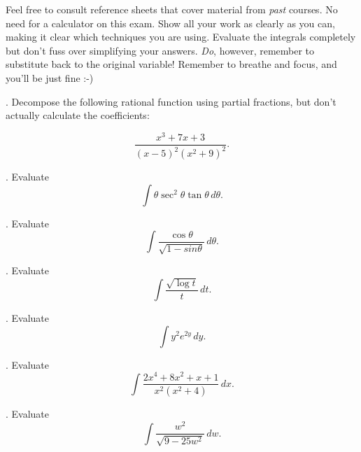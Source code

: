 \documentclass[12pt, letterpaper]{article}
\begin{document}
\noindent Feel free to consult reference sheets that cover material from \emph{past} courses. No need for a calculator on this exam. Show all your work as clearly as you can, making it clear which techniques you are using. Evaluate the integrals completely but don't fuss over simplifying your answers. \emph{Do}, however, remember to substitute back to the original variable! Remember to breathe and focus, and you'll be just fine :-)

\vspace*{0.3in}
. Decompose the following rational function using partial fractions, but don't actually calculate the coefficients:

$$\frac{x^3 + 7x + 3}{(x-5)^2(x^2 + 9)^2}.$$


\vspace*{0.3in}
. Evaluate $$ \int \theta \sec^2{\theta} \tan{\theta} \, d\theta. $$



\vspace*{0.3in}
. Evaluate $$ \int \frac{\cos{\theta}}{\sqrt{1 - sin{\theta}}} \, d\theta. $$



\vspace*{0.3in}
. Evaluate $$ \int \frac{\sqrt{\log{t}}}{t} \, dt. $$



\vspace*{0.3in}
. Evaluate $$ \int y^2 e^{2y} \, dy. $$



\vspace*{0.3in}
. Evaluate $$ \int \frac{2x^4 + 8x^2 + x + 1}{x^2 (x^2 + 4)} \, dx. $$



\vspace*{0.3in}
. Evaluate $$ \int \frac{w^2}{\sqrt{9 - 25 w^2}} \, dw. $$
\end{document}
